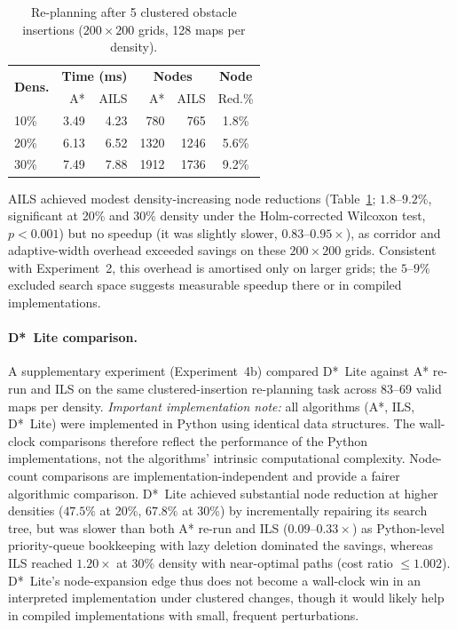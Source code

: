 \documentclass[preprint,12pt,authoryear]{elsarticle}
\begin{document}
\begin{table}[!htbp]
\centering
\caption{Re-planning after 5 clustered obstacle insertions ($200 \times 200$ grids, 128 maps per density).}
\label{tab:exp4_replan}
\begin{tabular}{lrrrrc}
\toprule
\multirow{2}{*}{\textbf{Dens.}} & \multicolumn{2}{c}{\textbf{Time (ms)}} & \multicolumn{2}{c}{\textbf{Nodes}} & \textbf{Node} \\
& A* & AILS & A* & AILS & Red.\% \\
\midrule
10\% & 3.49 & 4.23 & 780 & 765 & 1.8\% \\
20\% & 6.13 & 6.52 & 1320 & 1246 & 5.6\% \\
30\% & 7.49 & 7.88 & 1912 & 1736 & 9.2\% \\
\bottomrule
\end{tabular}
\end{table}

AILS achieved modest density-increasing node reductions (Table~\ref{tab:exp4_replan}; $1.8$--$9.2\%$, significant at 20\% and 30\% density under the Holm-corrected Wilcoxon test, $p < 0.001$) but no speedup (it was slightly slower, $0.83$--$0.95\times$), as corridor and adaptive-width overhead exceeded savings on these $200 \times 200$ grids. Consistent with Experiment~2, this overhead is amortised only on larger grids; the $5$--$9\%$ excluded search space suggests measurable speedup there or in compiled implementations.

\paragraph{D*~Lite comparison.}
A supplementary experiment (Experiment~4b) compared D*~Lite against A* re-run and ILS on the same clustered-insertion re-planning task across 83--69 valid maps per density.
\emph{Important implementation note:} all algorithms (A*, ILS, D*~Lite) were implemented in Python using identical data structures. The wall-clock comparisons therefore reflect the performance of the Python implementations, not the algorithms' intrinsic computational complexity. Node-count comparisons are implementation-independent and provide a fairer algorithmic comparison.
D*~Lite achieved substantial node reduction at higher densities ($47.5\%$ at 20\%, $67.8\%$ at 30\%) by incrementally repairing its search tree, but was slower than both A* re-run and ILS ($0.09$--$0.33\times$) as Python-level priority-queue bookkeeping with lazy deletion dominated the savings, whereas ILS reached $1.20\times$ at 30\% density with near-optimal paths (cost ratio $\leq 1.002$). D*~Lite's node-expansion edge thus does not become a wall-clock win in an interpreted implementation under clustered changes, though it would likely help in compiled implementations with small, frequent perturbations.
\end{document}
